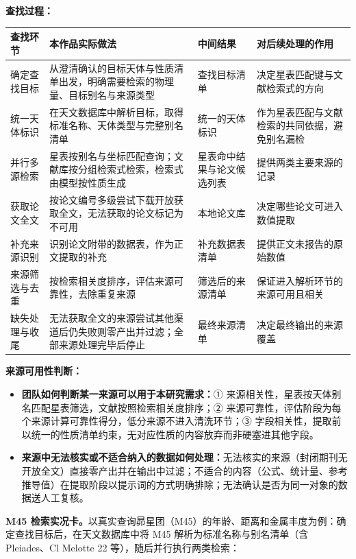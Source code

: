 \noindent\textbf{查找过程：}

\begin{longtable}{@{}p{2.3cm}p{6.8cm}p{2.8cm}p{2.6cm}@{}}
\toprule
查找环节 & 本作品实际做法 & 中间结果 & 对后续处理的作用 \\
\midrule
确定查找目标 & 从澄清确认的目标天体与性质清单出发，明确需要检索的物理量、目标别名与来源类型 & 查找目标清单 & 决定星表匹配键与文献检索式的方向 \\
统一天体标识 & 在天文数据库中解析目标，取得标准名称、天体类型与完整别名清单 & 统一的天体标识 & 作为星表匹配与文献检索的共同依据，避免别名漏检 \\
并行多源检索 & 星表按别名与坐标匹配查询；文献库按分组检索式检索，检索式由模型按性质生成 & 星表命中结果与论文候选列表 & 提供两类主要来源的记录 \\
获取论文全文 & 按论文编号多级尝试下载开放获取全文，无法获取的论文标记为不可用 & 本地论文库 & 决定哪些论文可进入数值提取 \\
补充来源识别 & 识别论文附带的数据表，作为正文提取的补充 & 补充数据表清单 & 提供正文未报告的原始数值 \\
来源筛选与去重 & 按检索相关度排序，评估来源可靠性，去除重复来源 & 筛选后的来源清单 & 保证进入解析环节的来源可用且相关 \\
缺失处理与收尾 & 无法获取全文的来源尝试其他渠道后仍失败则零产出并过滤；全部来源处理完毕后停止 & 最终来源清单 & 决定最终输出的来源覆盖 \\
\bottomrule
\end{longtable}

\noindent\textbf{来源可用性判断：}

\begin{itemize}[leftmargin=1.2em,itemsep=2pt]
\item \textbf{团队如何判断某一来源可以用于本研究需求：}① 来源相关性，星表按天体别名匹配星表筛选，文献按照检索相关度排序；② 来源可靠性，评估阶段为每个来源计算可靠性得分，低分来源不进入清洗环节；③ 字段相关性，提取前以统一的性质清单约束，无对应性质的内容放弃而非硬塞进其他字段。
\item \textbf{来源中无法核实或不适合纳入的数据如何处理：}无法核实的来源（封闭期刊无开放全文）直接零产出并在输出中过滤；不适合的内容（公式、统计量、参考推导值）在提取阶段以提示词的方式明确排除；无法确认是否为同一对象的数据送人工复核。
\end{itemize}

\noindent\textbf{M45 检索实况卡。}以真实查询昴星团（M45）的年龄、距离和金属丰度为例：确定查找目标后，在天文数据库中将 M45 解析为标准名称与别名清单（含 Pleiades、Cl Melotte 22 等），随后并行执行两类检索：

